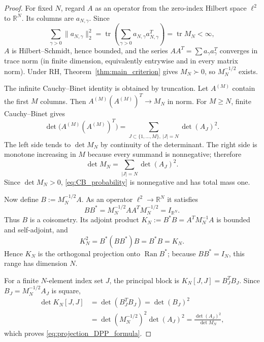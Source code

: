 \documentclass[preprint,12pt]{elsarticle}
\numberwithin{equation}{section}
\theoremstyle{plain}
\theoremstyle{definition}
\theoremstyle{remark}
\newcommand{\RH}{\mathrm{RH}}
\begin{document}
\begin{proof}
For fixed $N$, regard $A$ as an operator from the zero-index Hilbert space $\ell^2$ to $\mathbb R^N$.  Its columns are $a_{N,\gamma}$.  Since
\begin{equation}
\sum_{\gamma>0}\|a_{N,\gamma}\|_2^2
=\operatorname{tr}\left(\sum_{\gamma>0}a_{N,\gamma}a_{N,\gamma}^T\right)
=\operatorname{tr}M_N<\infty,
\end{equation}
$A$ is Hilbert--Schmidt, hence bounded, and the series $AA^T=\sum a_\gamma a_\gamma^T$ converges in trace norm (in finite dimension, equivalently entrywise and in every matrix norm).  Under $\RH$, Theorem~\ref{thm:main_criterion} gives $M_N\succ0$, so $M_N^{-1/2}$ exists.

The infinite Cauchy--Binet identity is obtained by truncation.  Let $A^{(M)}$ contain the first $M$ columns.  Then
$A^{(M)}(A^{(M)})^T\to M_N$ in norm.  For $M\ge N$, finite Cauchy--Binet gives
\begin{equation}
\det\bigl(A^{(M)}(A^{(M)})^T\bigr)
=\sum_{J\subset\{1,\ldots,M\},\ |J|=N}\det(A_J)^2.
\end{equation}
The left side tends to $\det M_N$ by continuity of the determinant.  The right side is monotone increasing in $M$ because every summand is nonnegative; therefore
\begin{equation}
\det M_N=\sum_{|J|=N}\det(A_J)^2.
\label{eq:CB_normalization_again}
\end{equation}
Since $\det M_N>0$, \eqref{eq:CB_probability} is nonnegative and has total mass one.

Now define $B:=M_N^{-1/2}A$.  As an operator $\ell^2\to\mathbb R^N$ it satisfies
\begin{equation}
BB^*=M_N^{-1/2}AA^TM_N^{-1/2}=I_{\mathbb R^N}.
\end{equation}
Thus $B$ is a coisometry.  Its adjoint product
$K_N:=B^*B=A^TM_N^{-1}A$ is bounded and self-adjoint, and
\begin{equation}
K_N^2=B^*(BB^*)B=B^*B=K_N.
\end{equation}
Hence $K_N$ is the orthogonal projection onto $\operatorname{Ran}B^*$; because $BB^*=I_N$, this range has dimension $N$.

For a finite $N$-element index set $J$, the principal block is
$K_N[J,J]=B_J^TB_J$.  Since $B_J=M_N^{-1/2}A_J$ is square,
\begin{align}
\det K_N[J,J]
&=\det(B_J^TB_J)=\det(B_J)^2\\
&=\det(M_N^{-1/2})^2\det(A_J)^2
=\frac{\det(A_J)^2}{\det M_N},
\end{align}
which proves \eqref{eq:projection_DPP_formula}.
\end{proof}
\end{document}
